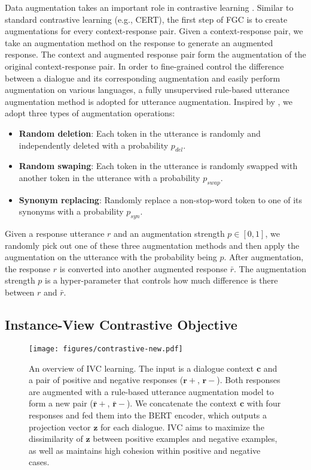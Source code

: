 \documentclass[letterpaper]{article} \usepackage{aaai22}  \usepackage{times}  \usepackage{helvet}  \usepackage{courier}  \usepackage[hyphens]{url}  \usepackage{graphicx} \urlstyle{rm} \def\UrlFont{\rm}  \usepackage{natbib}  \usepackage{caption} \DeclareCaptionStyle{ruled}{labelfont=normalfont,labelsep=colon,strut=off} \frenchspacing  \setlength{\pdfpagewidth}{8.5in}  \setlength{\pdfpageheight}{11in}  \usepackage{algorithm}
\begin{document}
Data augmentation takes an important role in contrastive learning \cite{zoph2020rethinking,ho2020contrastive}. 
Similar to standard contrastive learning (e.g., CERT), the first step of FGC is to create augmentations for every context-response pair. Given a context-response pair, we take an augmentation method on the response to generate an augmented response. The context and augmented response pair form the augmentation of the original context-response pair. In order to fine-grained control the difference between a dialogue and its corresponding augmentation and easily perform augmentation on various languages, a fully unsupervised rule-based utterance augmentation method is adopted for utterance augmentation. Inspired by \cite{wei-zou-2019-eda}, we adopt three types of augmentation operations:
\begin{itemize}
    \item \textbf{Random deletion}: Each token in the utterance is randomly and independently deleted with a probability $p_{del}$. \item \textbf{Random swaping}: Each token in the utterance is randomly swapped with another token in the utterance with a probability $p_{swap}$.
    \item \textbf{Synonym replacing}: Randomly replace a non-stop-word token to one of its synonyms with a probability $p_{syn}$.\end{itemize}

Given a response utterance $r$ and an augmentation strength $p \in [0,1]$, we randomly pick out one of these three augmentation methods and then apply the augmentation on the utterance with the probability being $p$. After augmentation, the response $r$ is converted into another augmented response $\bar{r}$. The augmentation strength $p$ is a hyper-parameter that controls how much difference is there between $r$ and $\bar{r}$. 


\subsection{Instance-View Contrastive Objective}
\label{sec:ins_cl}

\begin{figure}[htbp]
    \centering
    \texttt{[image: figures/contrastive-new.pdf]}
    \caption{An overview of IVC learning. The input is a dialogue context $\mathbf{c}$ and a pair of positive and negative responses ($\mathbf{r}+$, $\mathbf{r}-$). Both responses are augmented with a rule-based utterance augmentation model to form a new pair ($\mathbf{\bar{r}}+$, $\mathbf{\bar{r}}-$). We concatenate the context $\mathbf{c}$ with four responses and fed them into the BERT encoder, which outputs a projection vector $\mathbf{z}$ for each dialogue. IVC aims to maximize the dissimilarity of $\mathbf{z}$ between positive examples and negative examples, as well as maintains high cohesion within positive and negative cases.}
    \label{fig:fine_contras}
\end{figure}
\end{document}
